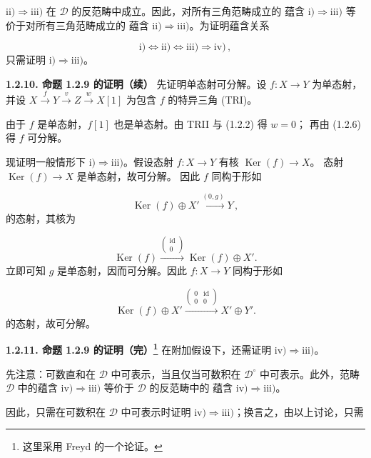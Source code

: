 \clearpage
{}%
\begingroup
\small
\setlength{\abovedisplayskip}{4pt plus 2pt minus 2pt}%
\setlength{\belowdisplayskip}{4pt plus 2pt minus 2pt}%

$\mathrm{ii)}\Longrightarrow\mathrm{iii)}$ 在 $\mathcal D$ 的反范畴中成立。因此，对所有三角范畴成立的
蕴含 $\mathrm{i)}\Longrightarrow\mathrm{iii)}$ 等价于对所有三角范畴成立的
蕴含 $\mathrm{ii)}\Longrightarrow\mathrm{iii)}$。为证明蕴含关系

\[
  \mathrm{i)}\Longleftrightarrow\mathrm{ii)}
  \Longleftrightarrow\mathrm{iii)}\Longrightarrow\mathrm{iv)}\,,
\]
只需证明 $\mathrm{i)}\Longrightarrow\mathrm{iii)}$。

\medskip
\noindent\textbf{1.2.10. 命题 1.2.9 的证明（续）}\quad
先证明单态射可分解。设 $f\colon X\longrightarrow Y$ 为单态射，并设
$X\xrightarrow{f}Y\xrightarrow{v}Z\xrightarrow{w}X[1]$ 为包含 $f$
的特异三角 (TRI)。

由于 $f$ 是单态射，$f[1]$ 也是单态射。由 TRII 与 (1.2.2) 得 $w=0$；
再由 (1.2.6) 得 $f$ 可分解。

现证明一般情形下 $\mathrm{i)}\Longrightarrow\mathrm{iii)}$。假设态射
$f\colon X\longrightarrow Y$ 有核 $\operatorname{Ker}(f)\longrightarrow X$。
态射 $\operatorname{Ker}(f)\longrightarrow X$ 是单态射，故可分解。
因此 $f$ 同构于形如

\[
  \operatorname{Ker}(f)\oplus X'
  \xrightarrow{(0,g)}Y\,,
\]
的态射，其核为

\[
  \operatorname{Ker}(f)
  \xrightarrow{\left(\begin{smallmatrix}\operatorname{id}\\0\end{smallmatrix}\right)}
  \operatorname{Ker}(f)\oplus X'.
\]
立即可知 $g$ 是单态射，因而可分解。因此 $f\colon X\longrightarrow Y$
同构于形如

\[
  \operatorname{Ker}(f)\oplus X'
  \xrightarrow{\left(\begin{smallmatrix}0&\operatorname{id}\\0&0\end{smallmatrix}\right)}
  X'\oplus Y'.
\]
的态射，故可分解。

\medskip
\noindent\textbf{1.2.11. 命题 1.2.9 的证明（完）\footnote{这里采用
Freyd 的一个论证。}}\quad
在附加假设下，还需证明 $\mathrm{iv)}\Longrightarrow\mathrm{iii)}$。

先注意：可数直和在 $\mathcal D$ 中可表示，当且仅当可数积在
$\mathcal D^{\circ}$ 中可表示。此外，范畴 $\mathcal D$ 中的蕴含
$\mathrm{iv)}\Longrightarrow\mathrm{iii)}$ 等价于 $\mathcal D$ 的反范畴中的
蕴含 $\mathrm{iv)}\Longrightarrow\mathrm{iii)}$。

因此，只需在可数积在 $\mathcal D$ 中可表示时证明
$\mathrm{iv)}\Longrightarrow\mathrm{iii)}$；换言之，由以上讨论，只需
\endgroup

